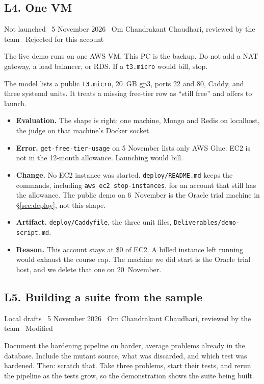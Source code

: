 \documentclass[11pt,a4paper]{article}
\newcommand{\meta}[1]{{\small #1}\par}
\newcommand{\step}[1]{\par\vspace{0.15em}{\bfseries #1}\par\vspace{-0.15em}}
\begin{document}
\subsection{L4. One VM}
\meta{Not launched \textperiodcentered\ 5 November 2026 \textperiodcentered\ Om Chandrakant Chaudhari, reviewed by the team \textperiodcentered\ Rejected for this account}

\step{1. Prompt}
The live demo runs on one AWS VM. This PC is the backup. Do not add a NAT gateway, a load balancer, or RDS. If a \texttt{t3.micro} would bill, stop.

\step{2. Reply (summarised)}
The model lists a public \texttt{t3.micro}, 20~GB gp3, ports 22 and 80, Caddy, and three systemd units. It treats a missing free-tier row as ``still free'' and offers to launch.

\step{3. Decision}
\begin{itemize}
\item \textbf{Evaluation.} The shape is right: one machine, Mongo and Redis on localhost, the judge on that machine's Docker socket.
\item \textbf{Error.} \texttt{get-free-tier-usage} on 5 November lists only AWS Glue. EC2 is not in the 12-month allowance. Launching would bill.
\item \textbf{Change.} No EC2 instance was started. \texttt{deploy/README.md} keeps the commands, including \texttt{aws ec2 stop-instances}, for an account that still has the allowance. The public demo on 6~November is the Oracle trial machine in \S\ref{sec:deploy}, not this shape.
\item \textbf{Artifact.} \texttt{deploy/Caddyfile}, the three unit files, \texttt{Deliverables/demo-script.md}.
\item \textbf{Reason.} This account stays at \$0 of EC2. A billed instance left running would exhaust the course cap. The machine we did start is the Oracle trial host, and we delete that one on 20~November.
\end{itemize}

\subsection{L5. Building a suite from the sample}
\meta{Local drafts \textperiodcentered\ 5 November 2026 \textperiodcentered\ Om Chandrakant Chaudhari, reviewed by the team \textperiodcentered\ Modified}

\step{1. Prompt}
Document the hardening pipeline on harder, average problems already in the database. Include the mutant source, what was discarded, and which test was hardened. Then: scratch that. Take three problems, start their tests, and rerun the pipeline as the tests grow, so the demonstration shows the suite being built.
\end{document}
